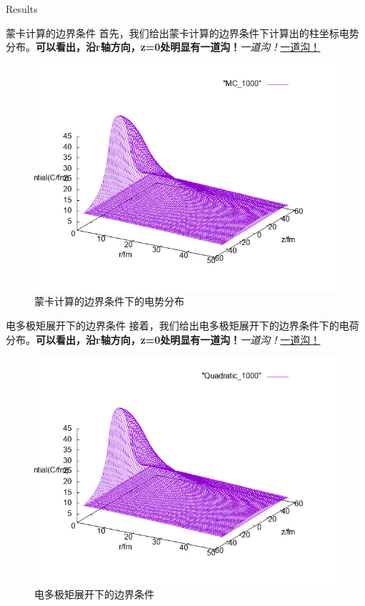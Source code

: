 \documentclass[letterpaper,12pt]{article}
\begin{document}
\begin{section}{Results}
	\begin{subsection}{蒙卡计算的边界条件}
		首先，我们给出蒙卡计算的边界条件下计算出的柱坐标电势分布。\textbf{可以看出，沿r轴方向，z=0处明显有一道沟！}\emph{一道沟！}\underline{一道沟！}
	 \begin{figure}[!htbp]
		\begin{center}
			\includegraphics[scale=.6]{MC_1000.jpg}
		\end{center}
		\label{p1}
		\caption{蒙卡计算的边界条件下的电势分布}
	 \end{figure}
     \end{subsection}

     \begin{subsection}{电多极矩展开下的边界条件}
        接着，我们给出电多极矩展开下的边界条件下的电荷分布。\textbf{可以看出，沿r轴方向，z=0处明显有一道沟！}\emph{一道沟！}\underline{一道沟！}
        \begin{figure}[!htbp]
        \begin{center}
            \includegraphics[scale=.6]{Quadratic_1000.jpg}
        \end{center}
        \label{p1}
        \caption{电多极矩展开下的边界条件}
     \end{figure}
     \end{subsection}


\end{section}
\end{document}
